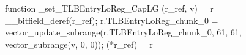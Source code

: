 function _set_TLBEntryLoReg_CapLG (r_ref, v) = {
    r = __bitfield_deref(r_ref);
    r.TLBEntryLoReg_chunk_0 = vector_update_subrange(r.TLBEntryLoReg_chunk_0, 61, 61, vector_subrange(v, 0, 0));
    (*r_ref) = r
}
